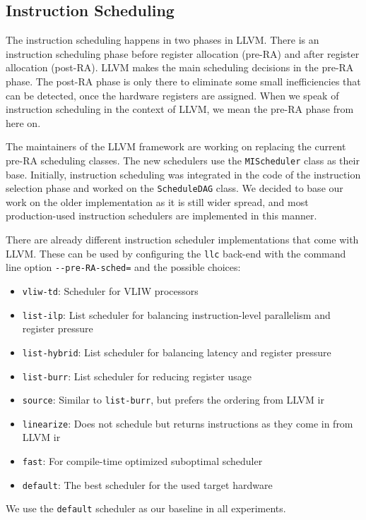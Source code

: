 \subsection{Instruction Scheduling}
The instruction scheduling happens in two phases in LLVM.
There is an instruction scheduling phase before register allocation (pre-RA) and after register allocation (post-RA).
LLVM makes the main scheduling decisions in the pre-RA phase.
The post-RA phase is only there to eliminate some small inefficiencies that can be detected, once the hardware registers are assigned.
When we speak of instruction scheduling in the context of LLVM, we mean the pre-RA phase from here on.

The maintainers of the LLVM framework are working on replacing the current pre-RA scheduling classes.
The new schedulers use the \lstinline|MIScheduler| class as their base.
Initially, instruction scheduling was integrated in the code of the instruction selection phase and worked on the \lstinline|ScheduleDAG| class.
We decided to base our work on the older implementation as it is still wider spread, and most production-used instruction schedulers are implemented in this manner.

There are already different instruction scheduler implementations that come with LLVM.
These can be used by configuring the \lstinline|llc| back-end with the command line option \lstinline|--pre-RA-sched=| and the possible choices:
\begin{itemize}
    \item \lstinline|vliw-td|: Scheduler for VLIW processors
    \item \lstinline|list-ilp|: List scheduler for balancing instruction-level parallelism and register pressure
    \item \lstinline|list-hybrid|: List scheduler for balancing latency and register pressure
    \item \lstinline|list-burr|: List scheduler for reducing register usage
    \item \lstinline|source|: Similar to \lstinline|list-burr|, but prefers the ordering from LLVM \ac{ir}
    \item \lstinline|linearize|: Does not schedule but returns instructions as they come in from LLVM \ac{ir}
    \item \lstinline|fast|: For compile-time optimized suboptimal scheduler
    \item \lstinline|default|: The best scheduler for the used target hardware
\end{itemize}
We use the \lstinline|default| scheduler as our baseline in all experiments.


